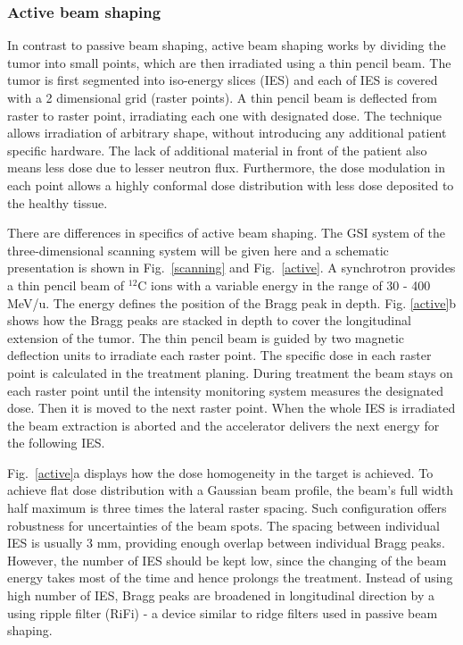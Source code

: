 \subsubsection{Active beam shaping}
\label{Sec::Active}

In contrast to passive beam shaping, active beam shaping works by dividing the tumor into small points, which are then irradiated using a thin pencil beam. The tumor is first segmented into iso-energy slices (IES) and each of IES
is covered with a 2 dimensional grid (raster points). A thin pencil beam is deflected from raster to raster point, irradiating each one with designated dose. The technique allows irradiation of arbitrary shape, without introducing any additional patient specific 
hardware. The lack of additional material in front of the patient also means less dose due to lesser neutron flux. Furthermore, the dose modulation in each point allows a highly conformal dose distribution with less dose deposited to the healthy tissue.

There are differences in specifics of active beam shaping. The GSI system of the three-dimensional scanning system will be given here \cite{Haberer1993,Kraft2000,Schardt2010} and a schematic presentation is shown in Fig.~\ref{scanning} and Fig.~\ref{active}.
A synchrotron provides a thin pencil beam of $^{12}$C ions with a variable energy in the range of 30 - 400 MeV/u. The energy defines the position of the Bragg peak in depth. Fig. \ref{active}b shows how the Bragg peaks are stacked in depth to cover the longitudinal extension of the tumor.
The thin pencil beam is guided by two magnetic deflection units to irradiate each raster point. The specific dose in each raster point is calculated in the treatment planing.
During treatment the beam stays on each raster point until the intensity monitoring system measures the designated dose. Then it is moved to the next raster point. When the whole IES is irradiated the beam extraction is aborted and the accelerator delivers
the next energy for the following IES.

Fig.~\ref{active}a displays how the dose homogeneity in the target is achieved. To achieve flat dose distribution with a Gaussian beam profile, the beam's full width half maximum is three times the lateral raster spacing. Such configuration offers robustness for uncertainties of the beam spots.
The spacing between individual IES is usually 3 mm, providing enough overlap between individual Bragg peaks. However, the number of IES should be kept low, since the changing of the beam energy takes most of the time and hence prolongs the treatment. Instead of using high number of
 IES, Bragg peaks are broadened in longitudinal direction by a using ripple filter (RiFi) - a device similar to ridge filters used in passive beam shaping. 

